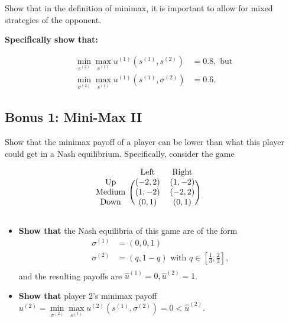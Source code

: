 \documentclass[10pt]{article}
\begin{document}
Show that in the definition of minimax, it is important to allow for mixed
strategies of the opponent.

\textbf{Specifically show that:}

\begin{align*}
    \min\limits_{s^{(2)}} \max\limits_{s^{(1)}} u^{(1)}(s^{(1)}, s^{(2)}) & = 0.8, \text{ but} \\
    \min\limits_{\sigma^{(2)}} \max\limits_{s^{(1)}} u^{(1)}(s^{(1)}, \sigma^{(2)}) & = 0.6.
\end{align*}


\subsection*{Bonus 1: Mini-Max II}

Show that the minimax payoff of a player can be lower than what this player
could get in a Nash equilibrium. Specifically, consider the game

\begin{equation*}
    \begin{blockarray}{cccc}
        & \text{Left} & \text{Right} \\
        \begin{block}{c(ccc)}
            \text{Up}  & (-2, 2)   & (1, -2)  \\
            \text{Medium} & (1, -2)   & (-2, 2)  \\
            \text{Down} & (0, 1) & (0, 1) \\
        \end{block}
    \end{blockarray}\qquad
\end{equation*}

\begin{itemize}
    \item \textbf{Show that} the Nash equilibria of this game are of the form
    \begin{align*}
        \sigma^{(1)} & = (0, 0, 1) \\
        \sigma^{(2)} & = (q, 1- q) \text{ with } q \in \left[\frac{1}{3}, \frac{2}{3}\right],\\
    \end{align*}
    and the resulting payoffs are \(\hat{u}^{(1)} = 0, \hat{u}^{(2)} = 1\).
    \item \textbf{Show that} player 2's minimax payoff \(u^{(2)} =
    \min\limits_{\sigma^{(2)}} \max\limits_{s^{(1)}} u^{(2)}(s^{(1)},
    \sigma^{(2)}) = 0 < \hat{u}^{(2)}\).
\end{itemize}
\end{document}
